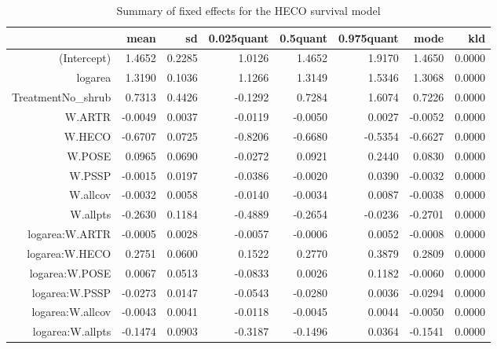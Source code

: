 \begin{table}[ht]
\centering
\caption{Summary of fixed effects for the HECO survival model} 
\label{HECOsurvival}
\begin{tabular}{rrrrrrrr}
  \hline
 & mean & sd & 0.025quant & 0.5quant & 0.975quant & mode & kld \\ 
  \hline
(Intercept) & 1.4652 & 0.2285 & 1.0126 & 1.4652 & 1.9170 & 1.4650 & 0.0000 \\ 
  logarea & 1.3190 & 0.1036 & 1.1266 & 1.3149 & 1.5346 & 1.3068 & 0.0000 \\ 
  TreatmentNo\_shrub & 0.7313 & 0.4426 & -0.1292 & 0.7284 & 1.6074 & 0.7226 & 0.0000 \\ 
  W.ARTR & -0.0049 & 0.0037 & -0.0119 & -0.0050 & 0.0027 & -0.0052 & 0.0000 \\ 
  W.HECO & -0.6707 & 0.0725 & -0.8206 & -0.6680 & -0.5354 & -0.6627 & 0.0000 \\ 
  W.POSE & 0.0965 & 0.0690 & -0.0272 & 0.0921 & 0.2440 & 0.0830 & 0.0000 \\ 
  W.PSSP & -0.0015 & 0.0197 & -0.0386 & -0.0020 & 0.0390 & -0.0032 & 0.0000 \\ 
  W.allcov & -0.0032 & 0.0058 & -0.0140 & -0.0034 & 0.0087 & -0.0038 & 0.0000 \\ 
  W.allpts & -0.2630 & 0.1184 & -0.4889 & -0.2654 & -0.0236 & -0.2701 & 0.0000 \\ 
  logarea:W.ARTR & -0.0005 & 0.0028 & -0.0057 & -0.0006 & 0.0052 & -0.0008 & 0.0000 \\ 
  logarea:W.HECO & 0.2751 & 0.0600 & 0.1522 & 0.2770 & 0.3879 & 0.2809 & 0.0000 \\ 
  logarea:W.POSE & 0.0067 & 0.0513 & -0.0833 & 0.0026 & 0.1182 & -0.0060 & 0.0000 \\ 
  logarea:W.PSSP & -0.0273 & 0.0147 & -0.0543 & -0.0280 & 0.0036 & -0.0294 & 0.0000 \\ 
  logarea:W.allcov & -0.0043 & 0.0041 & -0.0118 & -0.0045 & 0.0044 & -0.0050 & 0.0000 \\ 
  logarea:W.allpts & -0.1474 & 0.0903 & -0.3187 & -0.1496 & 0.0364 & -0.1541 & 0.0000 \\ 
   \hline
\end{tabular}
\end{table}

